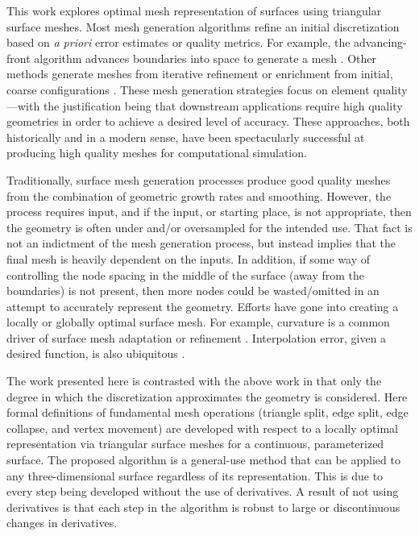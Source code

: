 This work explores optimal mesh representation of surfaces using 
triangular surface meshes.
Most mesh generation algorithms refine an initial discretization based
on {\it a priori} error estimates or quality metrics. For example, the
advancing-front algorithm advances boundaries into space to generate a
mesh \cite{tristrano98,diaz-morcillo98}. Other methods generate
meshes from iterative refinement or enrichment from initial, coarse
configurations \cite{marcum98,marcum00,shewchuk02}. These mesh
generation strategies focus on element quality---with the
justification being that downstream applications require high quality
geometries in order to achieve a desired level of accuracy. These
approaches, both historically and in a modern sense, have been 
spectacularly successful at producing high quality meshes for 
computational simulation.

Traditionally, surface mesh generation processes produce good quality
meshes from the combination of geometric growth rates and smoothing.
However, the process requires input, and if the input, or starting place,
is not appropriate, then the geometry is often under and/or oversampled
for the intended use. That fact is not an indictment of the mesh
generation process, but instead implies that the final mesh is heavily
dependent on the inputs. In addition, if some way of controlling the
node spacing in the middle of the surface (away from the boundaries) is
not present, then more nodes could be wasted/omitted in an attempt to
accurately represent the geometry. Efforts have gone into
creating a locally or globally optimal surface mesh. For example,
curvature is a common driver of surface mesh adaptation or refinement
\cite{siqueria13}. Interpolation error, given a desired function, 
is also ubiquitous \cite{peraire87,alauzet06,buscaglia97,huang05}.

The work presented here is contrasted with the above work in that only
the degree in which the discretization approximates the geometry is
considered.  Here formal definitions of fundamental mesh operations
(triangle split, edge split, edge collapse, and vertex movement) are
developed with respect to a locally optimal representation via 
triangular surface meshes for a continuous, parameterized surface. The 
proposed algorithm is a general-use method
that can be applied to any three-dimensional surface regardless of its 
representation.
This is due to every step being developed without the use of
derivatives. A result of not using derivatives is that each step in the
algorithm is robust to large or discontinuous changes in derivatives.

